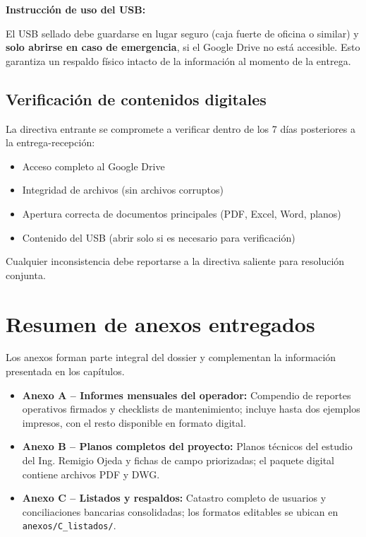 \textbf{Instrucción de uso del USB:}

El USB sellado debe guardarse en lugar seguro (caja fuerte de oficina o similar) y \textbf{solo abrirse en caso de emergencia}, si el Google Drive no está accesible. Esto garantiza un respaldo físico intacto de la información al momento de la entrega.

\subsection*{Verificación de contenidos digitales}

La directiva entrante se compromete a verificar dentro de los 7 días posteriores a la entrega-recepción:

\begin{itemize}
  \item Acceso completo al Google Drive
  \item Integridad de archivos (sin archivos corruptos)
  \item Apertura correcta de documentos principales (PDF, Excel, Word, planos)
  \item Contenido del USB (abrir solo si es necesario para verificación)
\end{itemize}

Cualquier inconsistencia debe reportarse a la directiva saliente para resolución conjunta.

\section*{Resumen de anexos entregados}

Los anexos forman parte integral del dossier y complementan la información presentada en los capítulos.

\begin{itemize}
  \item \textbf{Anexo A -- Informes mensuales del operador:} Compendio de reportes operativos firmados y checklists de mantenimiento; incluye hasta dos ejemplos impresos, con el resto disponible en formato digital.
  \item \textbf{Anexo B -- Planos completos del proyecto:} Planos técnicos del estudio del Ing. Remigio Ojeda y fichas de campo priorizadas; el paquete digital contiene archivos PDF y DWG.
  \item \textbf{Anexo C -- Listados y respaldos:} Catastro completo de usuarios y conciliaciones bancarias consolidadas; los formatos editables se ubican en \texttt{anexos/C\_listados/}.
\end{itemize}

